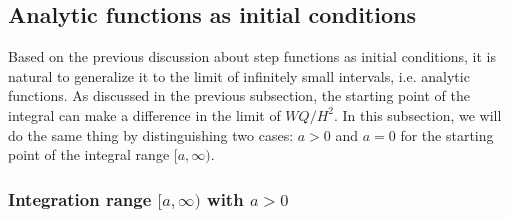 \documentclass[english,aps,superscriptaddress,preprint]{revtex4-1}
\begin{document}
\subsection{Analytic functions as initial conditions}

Based on the previous discussion about step functions as initial conditions,
it is natural to generalize it to the limit of infinitely small intervals,
i.e. analytic functions. As discussed in the previous subsection,
the starting point of the integral can make a difference in the limit
of $WQ/H^{2}$. In this subsection, we will do the same thing by distinguishing
two cases: $a>0$ and $a=0$ for the starting point of the integral
range $[a,\infty)$.

\subsubsection{Integration range $[a,\infty)$ with $a>0$}
\end{document}
